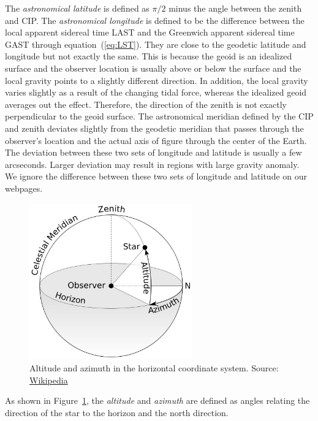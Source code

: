 \documentclass[12pt]{article}
\begin{document}
The {\em astronomical latitude} is defined as $\pi/2$ minus the angle between 
the zenith and CIP. The {\em astronomical longitude} is defined to be the 
difference between the local apparent sidereal time LAST and the Greenwich 
apparent sidereal time GAST through equation~(\ref{eq:LST}).
They are close to the geodetic latitude and longitude but not exactly the same. 
This is because the geoid 
is an idealized surface and the observer location is usually above or below the 
surface and the local gravity points to a slightly different direction. 
In addition, the local gravity varies slightly as a result of the changing 
tidal force, whereas the idealized geoid averages out the effect. Therefore, 
the direction of the zenith is not exactly perpendicular to the geoid surface.
The astronomical meridian defined by the CIP and zenith deviates slightly from the 
geodetic meridian that passes through the observer's location and the actual axis 
of figure through the center of the Earth. The deviation between these two sets 
of longitude and latitude is usually a few arcseconds. Larger deviation may result 
in regions with large gravity anomaly. We ignore the difference between these 
two sets of longitude and latitude on our webpages.

\begin{figure}[h]
\begin{center}
\includegraphics[width=7cm]{Azimuth-Altitude.jpg}
\end{center}
\caption{Altitude and azimuth in the horizontal coordinate system.
Source: \href{https://en.wikipedia.org/wiki/Horizontal_coordinate_system}{Wikipedia}}
\label{fig:horizontal}
\end{figure}

As shown in Figure~\ref{fig:horizontal}, the {\em altitude} and {\em azimuth} 
are defined as angles relating the direction of the star to the horizon and 
the north direction.
\end{document}
